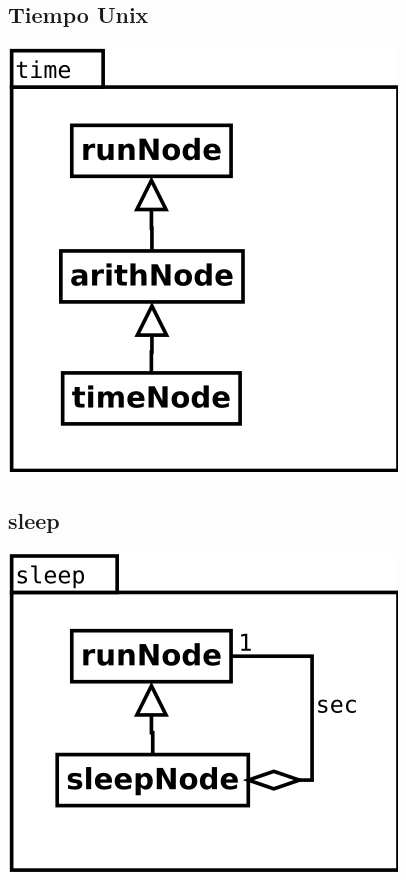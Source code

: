 \subsection {Tiempo Unix} 
\begin{center}
\includegraphics[scale=0.4]{time.png} \\
\end{center}

\subsection {sleep} 
\begin{center}
\includegraphics[scale=0.4]{sleep.png} \\
\end{center}
\pagebreak
